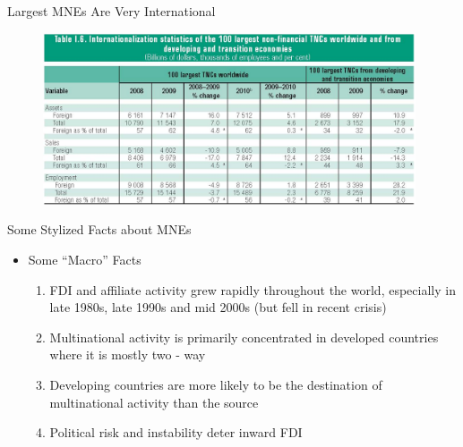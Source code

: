 \documentclass[10pt,hyperref={CJKbookmarks=true},xcolor=dvipsnames,aspectratio=169]{beamer}
\begin{document}
\begin{frame}{Largest MNEs Are Very International }


\begin{figure}


\begin{centering}
\includegraphics[width=11cm]{fig/fdi/lec7-4}
\par\end{centering}

\end{figure}

\end{frame}

\begin{frame}{Some Stylized Facts about MNEs }

\begin{itemize}
\item Some “Macro” Facts 

\begin{enumerate}
\item FDI and affiliate activity grew rapidly throughout the world, especially
in late 1980s, late 1990s and mid 2000s (but fell in recent crisis) 
\item Multinational activity is primarily concentrated in developed countries
where it is mostly two - way
\item Developing countries are more likely to be the destination of multinational
activity than the source
\item Political risk and instability deter inward FDI
\end{enumerate}
\end{itemize}
\end{frame}
\end{document}
